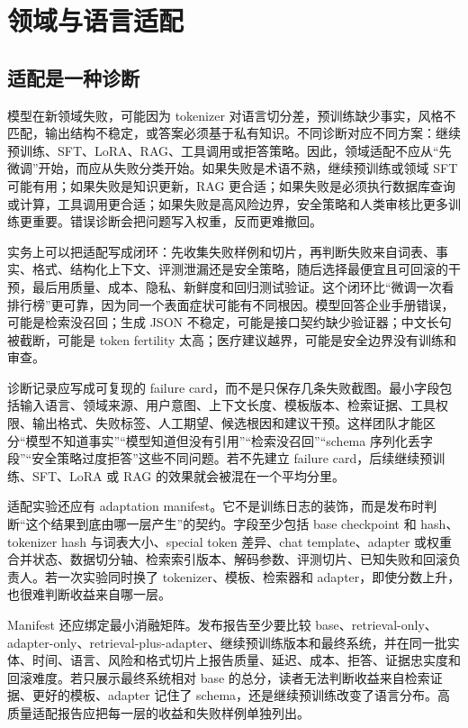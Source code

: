 \documentclass[UTF8,zihao=-4,openany]{ctexbook}
\begin{document}
\chapter{领域与语言适配}
\section{适配是一种诊断}
模型在新领域失败，可能因为 tokenizer 对语言切分差，预训练缺少事实，风格不匹配，输出结构不稳定，或答案必须基于私有知识。不同诊断对应不同方案：继续预训练、SFT、LoRA、RAG、工具调用或拒答策略。因此，领域适配不应从“先微调”开始，而应从失败分类开始。如果失败是术语不熟，继续预训练或领域 SFT 可能有用；如果失败是知识更新，RAG 更合适；如果失败是必须执行数据库查询或计算，工具调用更合适；如果失败是高风险边界，安全策略和人类审核比更多训练更重要。错误诊断会把问题写入权重，反而更难撤回。

实务上可以把适配写成闭环：先收集失败样例和切片，再判断失败来自词表、事实、格式、结构化上下文、评测泄漏还是安全策略，随后选择最便宜且可回滚的干预，最后用质量、成本、隐私、新鲜度和回归测试验证。这个闭环比“微调一次看排行榜”更可靠，因为同一个表面症状可能有不同根因。模型回答企业手册错误，可能是检索没召回；生成 JSON 不稳定，可能是接口契约缺少验证器；中文长句被截断，可能是 token fertility 太高；医疗建议越界，可能是安全边界没有训练和审查。

诊断记录应写成可复现的 failure card，而不是只保存几条失败截图。最小字段包括输入语言、领域来源、用户意图、上下文长度、模板版本、检索证据、工具权限、输出格式、失败标签、人工期望、候选根因和建议干预。这样团队才能区分“模型不知道事实”“模型知道但没有引用”“检索没召回”“schema 序列化丢字段”“安全策略过度拒答”这些不同问题。若不先建立 failure card，后续继续预训练、SFT、LoRA 或 RAG 的效果就会被混在一个平均分里。

适配实验还应有 adaptation manifest。它不是训练日志的装饰，而是发布时判断“这个结果到底由哪一层产生”的契约。字段至少包括 base checkpoint 和 hash、tokenizer hash 与词表大小、special token 差异、chat template、adapter 或权重合并状态、数据切分轴、检索索引版本、解码参数、评测切片、已知失败和回滚负责人。若一次实验同时换了 tokenizer、模板、检索器和 adapter，即使分数上升，也很难判断收益来自哪一层。

Manifest 还应绑定最小消融矩阵。发布报告至少要比较 base、retrieval-only、adapter-only、retrieval-plus-adapter、继续预训练版本和最终系统，并在同一批实体、时间、语言、风险和格式切片上报告质量、延迟、成本、拒答、证据忠实度和回滚难度。若只展示最终系统相对 base 的总分，读者无法判断收益来自检索证据、更好的模板、adapter 记住了 schema，还是继续预训练改变了语言分布。高质量适配报告应把每一层的收益和失败样例单独列出。
\end{document}
